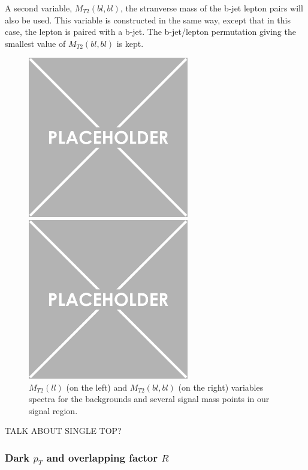 \documentclass[a4paper, 10pt, openright]{report}
\begin{document}
A second variable, $M_{T2}(bl, bl)$, the stranverse mass of the b-jet lepton pairs will also be used. This variable is constructed in the same way, except that in this case, the lepton is paired with a b-jet. The b-jet/lepton permutation giving the smallest value of $M_{T2}(bl, bl)$ is kept.

\begin{figure}[htbp]
\centering
\begin{minipage}[b]{.48\textwidth}
\includegraphics[width=7cm, height=7cm]{figs/placeholder.png}
\end{minipage}\hfill
\begin{minipage}[b]{.48\textwidth}
\includegraphics[width=7cm, height=7cm]{figs/placeholder.png}
\end{minipage} \hfill
\caption{$M_{T2}(ll)$ (on the left) and $M_{T2}(bl, bl)$ (on the right) variables spectra for the backgrounds and several signal mass points in our signal region.}
\label{fig:SRdiscMET}
\end{figure}

\color{red} TALK ABOUT SINGLE TOP? \color{black}

\subsubsection*{Dark $p_T$ and overlapping factor $R$}
\end{document}
